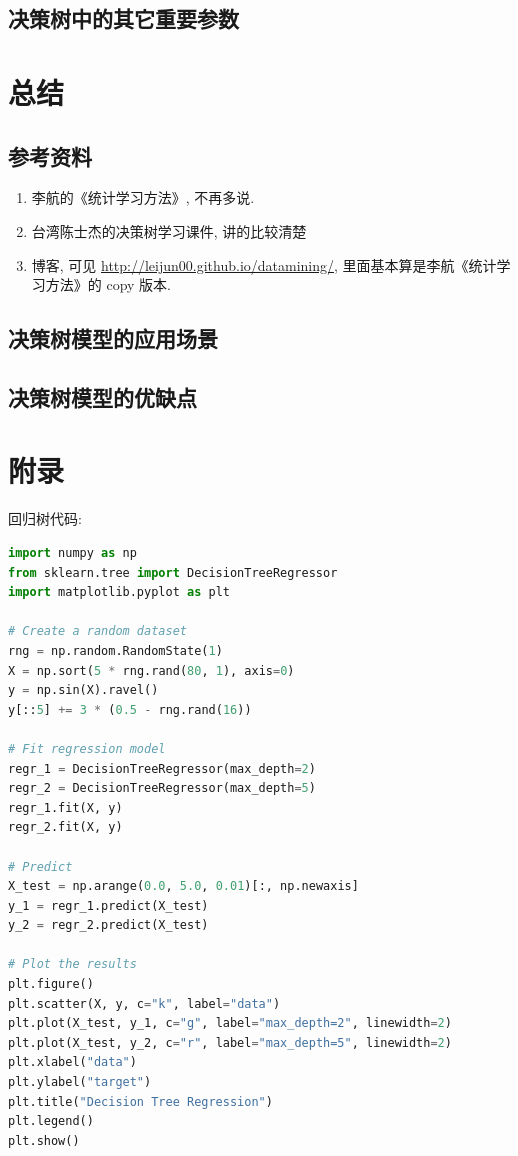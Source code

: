 \documentclass[a4paper,UTF8]{ctexart}
\theoremstyle{plain} \newtheorem{theorem}{定理}[section]
\theoremstyle{plain} \newtheorem{definition}{定义}[section]
\theoremstyle{plain} \newtheorem{lemma}{引理}[section]
\theoremstyle{plain} \newtheorem{proposition}{命题}[section]
\theoremstyle{plain} \newtheorem{example}{例}
\theoremstyle{plain} \newtheorem{remark}{注}
\theoremstyle{plain} \newtheorem{corollary}{推论}[section]
\begin{document}
\subsection{决策树中的其它重要参数}




\section{总结}
\subsection{参考资料}
\begin{enumerate}[(1)]
\item 李航的《统计学习方法》, 不再多说.

\item 台湾陈士杰的决策树学习课件, 讲的比较清楚

\item 博客, 可见 \url{http://leijun00.github.io/datamining/}, 里面基本算是李航《统计学习方法》的 copy 版本.

\end{enumerate}



\subsection{决策树模型的应用场景}





\subsection{决策树模型的优缺点}





\newpage

\section*{附录}

回归树代码:
\begin{lstlisting}[language = python]
import numpy as np
from sklearn.tree import DecisionTreeRegressor
import matplotlib.pyplot as plt

# Create a random dataset
rng = np.random.RandomState(1)
X = np.sort(5 * rng.rand(80, 1), axis=0)
y = np.sin(X).ravel()
y[::5] += 3 * (0.5 - rng.rand(16))

# Fit regression model
regr_1 = DecisionTreeRegressor(max_depth=2)
regr_2 = DecisionTreeRegressor(max_depth=5)
regr_1.fit(X, y)
regr_2.fit(X, y)

# Predict
X_test = np.arange(0.0, 5.0, 0.01)[:, np.newaxis]
y_1 = regr_1.predict(X_test)
y_2 = regr_2.predict(X_test)

# Plot the results
plt.figure()
plt.scatter(X, y, c="k", label="data")
plt.plot(X_test, y_1, c="g", label="max_depth=2", linewidth=2)
plt.plot(X_test, y_2, c="r", label="max_depth=5", linewidth=2)
plt.xlabel("data")
plt.ylabel("target")
plt.title("Decision Tree Regression")
plt.legend()
plt.show()
\end{lstlisting}
\end{document}
